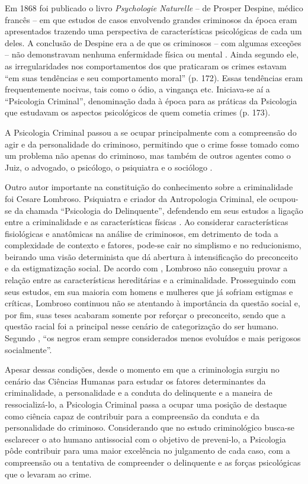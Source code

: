 Em 1868 foi publicado o livro \emph{Psychologie Naturelle} -- de Prosper Despine, médico francês -- em que estudos de casos envolvendo grandes criminosos da época eram apresentados trazendo uma perspectiva de características psicológicas de cada um deles. A conclusão de Despine era a de que os criminosos -- com algumas exceções -- não demonstravam nenhuma enfermidade física ou mental \cite{LEAL2008}. Ainda segundo ele, as irregularidades nos comportamentos dos que praticaram os crimes estavam ``em suas tendências e seu comportamento moral'' (p. 172). Essas tendências eram frequentemente nocivas, tais como o ódio, a vingança etc. Iniciava-se aí a ``Psicologia Criminal'', denominação dada à época para as práticas da Psicologia que estudavam os aspectos psicológicos de quem cometia crimes (p. 173). 

A Psicologia Criminal passou a se ocupar principalmente com a compreensão do agir e da personalidade do criminoso, permitindo que o crime fosse tomado como um problema não apenas do criminoso, mas também de outros agentes como o Juiz, o advogado, o psicólogo, o psiquiatra e o sociólogo .

Outro autor importante na constituição do conhecimento sobre a criminalidade foi Cesare Lombroso. Psiquiatra e criador da Antropologia Criminal, ele ocupou-se da chamada ``Psicologia do Delinquente'', defendendo em seus estudos a ligação entre a criminalidade e as características físicas \cite{JESUS2001}. Ao considerar características fisiológicas e anatômicas na análise de criminosos, em detrimento de toda a complexidade de contexto e fatores, pode-se cair no simplismo e no reducionismo, beirando uma visão determinista que dá abertura à intensificação do preconceito e da estigmatização social. De acordo com , Lombroso não conseguiu provar a relação entre as características hereditárias e a criminalidade. Prosseguindo com seus estudos, em sua maioria com homens e mulheres que já sofriam estigmas e críticas, Lombroso continuou não se atentando à importância da questão social e, por fim, suas teses acabaram somente por reforçar o preconceito, sendo que a questão racial foi a principal nesse cenário de categorização do ser humano. Segundo , ``os negros eram sempre considerados menos evoluídos e mais perigosos socialmente''.

Apesar dessas condições, desde o momento em que a criminologia surgiu no cenário das Ciências Humanas para estudar os fatores determinantes da criminalidade, a personalidade e a conduta do delinquente e a maneira de ressocializá-lo, a Psicologia Criminal passa a ocupar uma posição de destaque como ciência capaz de contribuir para a compreensão da conduta e da personalidade do criminoso. Considerando que no estudo criminológico busca-se esclarecer o ato humano antissocial com o objetivo de preveni-lo, a Psicologia pôde contribuir para uma maior excelência no julgamento de cada caso, com a compreensão ou a tentativa de compreender o delinquente e as forças psicológicas que o levaram ao crime.

